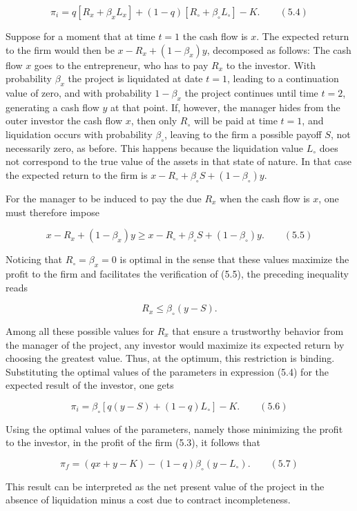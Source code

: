 \documentclass[11pt,a4paper]{article}
\begin{document}
\[\pi_i = q[R_x + \beta_x L_x] + (1 - q)[R_\circ + \beta_\circ L_\circ] - K. \qquad (5.4)\]

Suppose for a moment that at time \(t = 1\) the cash flow is \(x\). The expected return to the firm
would then be \(x - R_x + (1 - \beta_x)y\), decomposed as follows: The cash flow \(x\) goes to the
entrepreneur, who has to pay \(R_x\) to the investor. With probability \(\beta_x\) the project is
liquidated at date \(t = 1\), leading to a continuation value of zero, and with probability
\(1 - \beta_x\) the project continues until time \(t = 2\), generating a cash flow \(y\) at that
point. If, however, the manager hides from the outer investor the cash flow \(x\), then only
\(R_\circ\) will be paid at time \(t = 1\), and liquidation occurs with probability \(\beta_\circ\),
leaving to the firm a possible payoff \(S\), not necessarily zero, as before. This happens because
the liquidation value \(L_\circ\) does not correspond to the true value of the assets in that state
of nature. In that case the expected return to the firm is
\(x - R_\circ + \beta_\circ S + (1 - \beta_\circ)y\).

For the manager to be induced to pay the due \(R_x\) when the cash flow is \(x\), one must therefore
impose

\[x - R_x + (1 - \beta_x)y \geq x - R_\circ + \beta_\circ S + (1 - \beta_\circ)y. \qquad (5.5)\]

Noticing that \(R_\circ = \beta_x = 0\) is optimal in the sense that these values maximize the
profit to the firm and facilitates the verification of (5.5), the preceding inequality reads

\[R_x \leq \beta_\circ(y - S).\]

Among all these possible values for \(R_x\) that ensure a trustworthy behavior from the manager of
the project, any investor would maximize its expected return by choosing the greatest value. Thus,
at the optimum, this restriction is binding. Substituting the optimal values of the parameters in
expression (5.4) for the expected result of the investor, one gets

\[\pi_i = \beta_\circ[q(y - S) + (1 - q)L_\circ] - K. \qquad (5.6)\]

Using the optimal values of the parameters, namely those minimizing the profit to the investor, in
the profit of the firm (5.3), it follows that

\[\pi_f = (qx + y - K) - (1 - q)\beta_\circ(y - L_\circ). \qquad (5.7)\]

This result can be interpreted as the net present value of the project in the absence of liquidation
minus a cost due to contract incompleteness.
\end{document}
